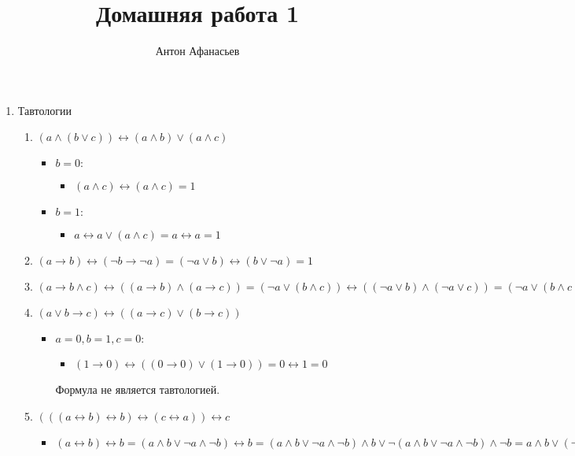 \documentclass[10pt]{article}
\begin{document}
\title{Домашняя работа 1}
\author{Антон Афанасьев}
\maketitle

\begin{enumerate}[1]

\item Тавтологии

\begin{enumerate}
\item $(a \land (b \lor c)) \leftrightarrow (a \land b) \lor (a \land c)$
	\begin{itemize}
		\item[] $b=0:$
		\begin{itemize}
			\item[] $(a \land c) \leftrightarrow (a \land c) = 1$
		\end{itemize}
		\item[] $b=1:$
		\begin{itemize}
			\item[] $a \leftrightarrow a \lor (a \land c) = a \leftrightarrow a = 1$
		\end{itemize}
	\end{itemize}
	
\item $(a \to b) \leftrightarrow (\neg b \to \neg a) = (\neg a \lor b) \leftrightarrow (b \lor \neg a) = 1$

\item $(a \to b \land c) \leftrightarrow ((a \to b) \land (a \to c)) = (\neg a \lor (b \land c)) \leftrightarrow ((\neg a \lor b) \land (\neg a \lor c)) = (\neg a \lor (b \land c)) \leftrightarrow (\neg a \lor (b \land c)) = 1$

\item $(a \lor b \to c) \leftrightarrow ((a \to c) \lor (b \to c))$
	\begin{itemize}
		\item[] $a=0, b=1, c=0:$
		\begin{itemize}
			\item[] $(1 \to 0) \leftrightarrow ((0 \to 0) \lor (1 \to 0)) = 0 \leftrightarrow 1 = 0$
		\end{itemize}
		Формула не является тавтологией.
	\end{itemize}

\item $(((a \leftrightarrow b) \leftrightarrow b) \leftrightarrow (c \leftrightarrow a)) \leftrightarrow c$
	\begin{itemize}
		\item[] $(a \leftrightarrow b) \leftrightarrow b = (a \land b \lor \neg a \land \neg b) \leftrightarrow b = (a \land b \lor \neg a \land \neg b) \land b \lor \neg (a \land b \lor \neg a \land \neg b) \land \neg b = a \land b \lor (\neg a \lor \neg b) \land (a \lor b) \land \neg b = a \land b \lor (\neg a \lor \neg b) \land a \land \neg b = a \land b \lor a \land \neg b = a \land (b \lor \neg b) = a$
	\end{itemize}


\end{enumerate}
\end{enumerate}
\end{document}
